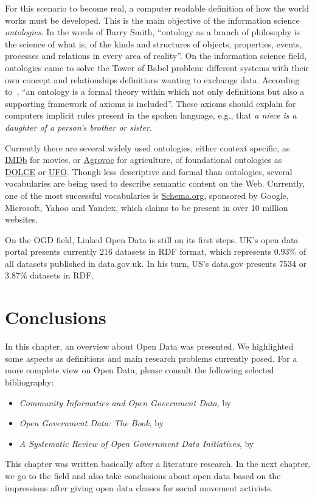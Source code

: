 For this scenario to become real, a computer readable definition of how the world works must be developed.
This is the main objective of the information science \emph{ontologies}.
In the words of Barry Smith, ``ontology as a branch of philosophy is the science of what is, of the kinds and structures of objects, properties, events, processes and relations in every area of reality''\cite{Smith2003}.
On the information science field, ontologies came to solve the Tower of Babel problem: different systems with their own concept and relationships definitions wanting to exchange data.
According to~, ``an ontology is a formal theory within which not only definitions but also a supporting framework of axioms is included''.
These axioms should explain for computers implicit rules present in the spoken language, e.g., that \emph{a niece is a daughter of a person's brother or sister}.

Currently there are several widely used ontologies, either context specific, as \href{http://www.imdb.com}{IMDb} for movies, or \href{http://aims.fao.org/skosmos/agrovoc/en/}{Agrovoc} for agriculture, of foundational ontologies as \href{http://www.loa.istc.cnr.it/old/DOLCE.html}{DOLCE} or \href{http://ontology.com.br/}{UFO}.
Though less descriptive and formal than ontologies, several vocabularies are being used to describe semantic content on the Web.
Currently, one of the most successful vocabularies is \href{http://schema.org}{Schema.org}, sponsored by Google, Microsoft, Yahoo and Yandex, which claims to be present in over 10 million websites.

On the OGD field, Linked Open Data is still on its first steps.
UK's open data portal presents currently 216 datasets in RDF format, which represents 0.93\% of all datasets published in data.gov.uk.
In his turn, US's data.gov presents 7534 or 3.87\% datasets in RDF.


\section{Conclusions}

In this chapter, an overview about Open Data was presented.
We highlighted some aspects as definitions and main research problems currently posed.
For a more complete view on Open Data, please consult the following selected bibliography:
\begin{itemize}
\item \emph{Community Informatics and Open Government Data}, by~
\item \emph{Open Government Data: The Book}, by~
\item \emph{A Systematic Review of Open Government Data Initiatives}, by~
\end{itemize}

This chapter was written basically after a literature research.
In the next chapter, we go to the field and also take conclusions about open data based on the impressions after giving open data classes for social movement activists.

